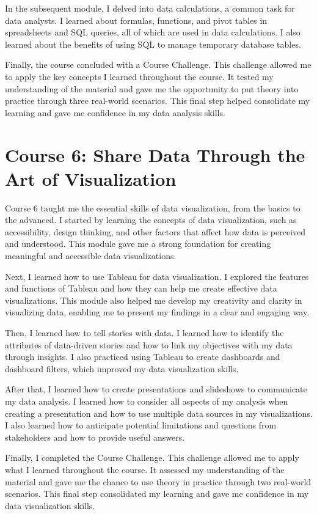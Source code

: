 \documentclass[]{article}
\begin{document}
In the subsequent module, I delved into data calculations, a common task for data analysts. I learned about formulas, functions, and pivot tables in spreadsheets and SQL queries, all of which are used in data calculations. I also learned about the benefits of using SQL to manage temporary database tables.

Finally, the course concluded with a Course Challenge. This challenge allowed me to apply the key concepts I learned throughout the course. It tested my understanding of the material and gave me the opportunity to put theory into practice through three real-world scenarios. This final step helped consolidate my learning and gave me confidence in my data analysis skills.

\section{Course 6: Share Data Through the Art of Visualization}
Course 6 taught me the essential skills of data visualization, from the basics to the advanced. I started by learning the concepts of data visualization, such as accessibility, design thinking, and other factors that affect how data is perceived and understood. This module gave me a strong foundation for creating meaningful and accessible data visualizations.

Next, I learned how to use Tableau for data visualization. I explored the features and functions of Tableau and how they can help me create effective data visualizations. This module also helped me develop my creativity and clarity in visualizing data, enabling me to present my findings in a clear and engaging way.

Then, I learned how to tell stories with data. I learned how to identify the attributes of data-driven stories and how to link my objectives with my data through insights. I also practiced using Tableau to create dashboards and dashboard filters, which improved my data visualization skills.

After that, I learned how to create presentations and slideshows to communicate my data analysis. I learned how to consider all aspects of my analysis when creating a presentation and how to use multiple data sources in my visualizations. I also learned how to anticipate potential limitations and questions from stakeholders and how to provide useful answers.

Finally, I completed the Course Challenge. This challenge allowed me to apply what I learned throughout the course. It assessed my understanding of the material and gave me the chance to use theory in practice through two real-world scenarios. This final step consolidated my learning and gave me confidence in my data visualization skills.
\end{document}
